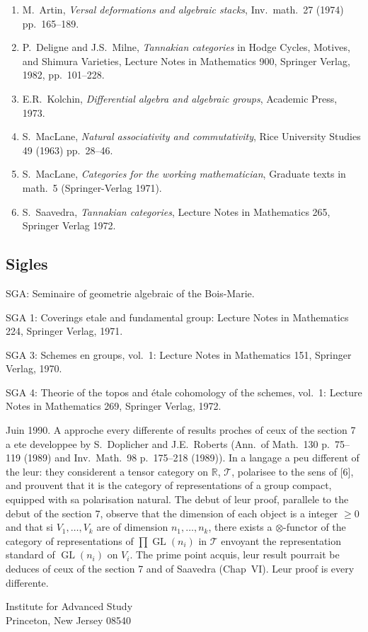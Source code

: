 \documentclass[12pt,a4paper]{article}
\theoremstyle{plain}
\theoremstyle{definition}
\DeclareMathOperator{\GL}{GL}
\begin{document}
\begin{enumerate}
\item[{[1]}] M.~Artin, \textit{Versal deformations and algebraic stacks}, Inv.~math.~27 (1974) pp.~165--189.

\item[{[2]}] P.~Deligne and J.S.~Milne, \textit{Tannakian categories} in Hodge Cycles, Motives, and Shimura Varieties, Lecture Notes in Mathematics 900, Springer Verlag, 1982, pp.~101--228.

\item[{[3]}] E.R.~Kolchin, \textit{Differential algebra and algebraic groups}, Academic Press, 1973.

\item[{[4]}] S.~MacLane, \textit{Natural associativity and commutativity}, Rice University Studies 49 (1963) pp.~28--46.

\item[{[5]}] S.~MacLane, \textit{Categories for the working mathematician}, Graduate texts in math.~5 (Springer-Verlag 1971).

\item[{[6]}] S.~Saavedra, \textit{Tannakian categories}, Lecture Notes in Mathematics 265, Springer Verlag 1972.
\end{enumerate}

\subsection*{Sigles}

SGA: Seminaire of geometrie algebraic of the Bois-Marie.

SGA 1: Coverings etale and fundamental group: Lecture Notes in Mathematics 224, Springer Verlag, 1971.

SGA 3: Schemes en groups, vol.~1: Lecture Notes in Mathematics 151, Springer Verlag, 1970.

SGA 4: Theorie of the topos and étale cohomology of the schemes, vol.~1: Lecture Notes in Mathematics 269, Springer Verlag, 1972.

\vspace{1cm}

Juin 1990. A approche every differente of results proches of ceux of the section 7 a ete developpee by S.~Doplicher and J.E.~Roberts (Ann.\ of Math.\ 130 p.~75--119 (1989) and Inv.\ Math.\ 98 p.~175--218 (1989)). In a langage a peu different of the leur: they considerent a tensor category on $\mathbb{R}$, $\mathcal{T}$, polarisee to the sens of [6], and prouvent that it is the category of representations of a group compact, equipped with sa polarisation natural. The debut of leur proof, parallele to the debut of the section 7, observe that the dimension of each object is a integer $\geq 0$ and that si $V_1, \ldots, V_k$ are of dimension $n_1, \ldots, n_k$, there exists a $\otimes$-functor of the category of representations of $\prod \GL(n_i)$ in $\mathcal{T}$ envoyant the representation standard of $\GL(n_i)$ on $V_i$. The prime point acquis, leur result pourrait be deduces of ceux of the section 7 and of Saavedra (Chap~VI). Leur proof is every differente.

\vspace{1cm}

\begin{flushright}
Institute for Advanced Study\\
Princeton, New Jersey 08540
\end{flushright}
\end{document}
